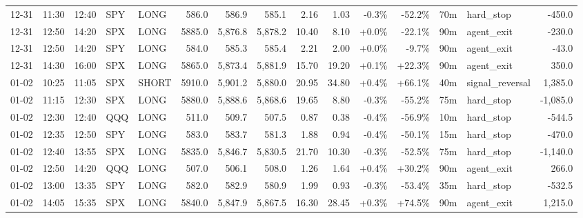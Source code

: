 \documentclass[11pt,a4paper,twoside]{article}
\begin{document}
\begin{landscape}
\begin{center}
\begin{longtable}{>{\color{txtmain}}l l l l l r r r r r r r r >{\color{txtmain}}l r}
12-31 & 11:30 & 12:40 & SPY & LONG & 586.0 & 586.9 & 585.1 & 2.16 & 1.03 & \textcolor{lossred}{-0.3\%} & \textcolor{lossred}{-52.2\%} & 70m & hard\_stop & \textcolor{lossred}{-450.0} \\
12-31 & 12:50 & 14:20 & SPX & LONG & 5885.0 & 5,876.8 & 5,878.2 & 10.40 & 8.10 & \textcolor{wingreen}{+0.0\%} & \textcolor{lossred}{-22.1\%} & 90m & agent\_exit & \textcolor{lossred}{-230.0} \\
12-31 & 12:50 & 14:20 & SPY & LONG & 584.0 & 585.3 & 585.4 & 2.21 & 2.00 & \textcolor{wingreen}{+0.0\%} & \textcolor{lossred}{-9.7\%} & 90m & agent\_exit & \textcolor{lossred}{-43.0} \\
12-31 & 14:30 & 16:00 & SPX & LONG & 5865.0 & 5,873.4 & 5,881.9 & 15.70 & 19.20 & \textcolor{wingreen}{+0.1\%} & \textcolor{wingreen}{+22.3\%} & 90m & agent\_exit & \textcolor{wingreen}{350.0} \\
01-02 & 10:25 & 11:05 & SPX & SHORT & 5910.0 & 5,901.2 & 5,880.0 & 20.95 & 34.80 & \textcolor{wingreen}{+0.4\%} & \textcolor{wingreen}{+66.1\%} & 40m & signal\_reversal & \textcolor{wingreen}{1,385.0} \\
01-02 & 11:15 & 12:30 & SPX & LONG & 5880.0 & 5,888.6 & 5,868.6 & 19.65 & 8.80 & \textcolor{lossred}{-0.3\%} & \textcolor{lossred}{-55.2\%} & 75m & hard\_stop & \textcolor{lossred}{-1,085.0} \\
01-02 & 12:30 & 12:40 & QQQ & LONG & 511.0 & 509.7 & 507.5 & 0.87 & 0.38 & \textcolor{lossred}{-0.4\%} & \textcolor{lossred}{-56.9\%} & 10m & hard\_stop & \textcolor{lossred}{-544.5} \\
01-02 & 12:35 & 12:50 & SPY & LONG & 583.0 & 583.7 & 581.3 & 1.88 & 0.94 & \textcolor{lossred}{-0.4\%} & \textcolor{lossred}{-50.1\%} & 15m & hard\_stop & \textcolor{lossred}{-470.0} \\
01-02 & 12:40 & 13:55 & SPX & LONG & 5835.0 & 5,846.7 & 5,830.5 & 21.70 & 10.30 & \textcolor{lossred}{-0.3\%} & \textcolor{lossred}{-52.5\%} & 75m & hard\_stop & \textcolor{lossred}{-1,140.0} \\
01-02 & 12:50 & 14:20 & QQQ & LONG & 507.0 & 506.1 & 508.0 & 1.26 & 1.64 & \textcolor{wingreen}{+0.4\%} & \textcolor{wingreen}{+30.2\%} & 90m & agent\_exit & \textcolor{wingreen}{266.0} \\
01-02 & 13:00 & 13:35 & SPY & LONG & 582.0 & 582.9 & 580.9 & 1.99 & 0.93 & \textcolor{lossred}{-0.3\%} & \textcolor{lossred}{-53.4\%} & 35m & hard\_stop & \textcolor{lossred}{-532.5} \\
01-02 & 14:05 & 15:35 & SPX & LONG & 5840.0 & 5,847.9 & 5,867.5 & 16.30 & 28.45 & \textcolor{wingreen}{+0.3\%} & \textcolor{wingreen}{+74.5\%} & 90m & agent\_exit & \textcolor{wingreen}{1,215.0} \\

\end{longtable}
\end{center}
\end{landscape}
\end{document}

